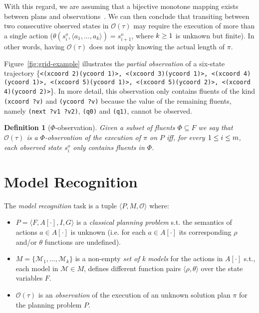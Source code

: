 \documentclass[letterpaper]{article} %
\newcommand{\tup}[1]{{\langle #1 \rangle}}
\newtheorem{definition}[theorem]{Definition}
\begin{document}
With this regard, we are assuming that a bijective monotone mapping exists between plans and observations~\cite{ramirez2009plan}. We can then  conclude that transiting between two consecutive observed states in $\mathcal{O}(\tau)$ may require the execution of more than a single action ($\theta(s_i^o,\tup{a_1,\ldots,a_k})=s_{i+1}^o$, where ${\small k\geq 1}$ is unknown but finite). In other words, having $\mathcal{O}(\tau)$ does not imply knowing the actual length of $\pi$.

Figure~\ref{fig:grid-example} illustrates the {\em partial observation} of a six-state trajectory \{{\tt\scriptsize<(xcoord 2)(ycoord 1)>, <(xcoord 3)(ycoord 1)>, <(xcoord 4)(ycoord 1)>, <(xcoord 5)(ycoord 1)>, <(xcoord 5)(ycoord 2)>, <(xcoord 4)(ycoord 2)>}\}. In more detail, this observation only contains fluents of the kind {\tt\small (xcoord ?v)} and {\tt\small (ycoord ?v)} because the value of the remaining fluents, namely {\tt\small (next ?v1 ?v2)}, {\tt\small (q0)} and {\tt\small (q1)}, cannot be observed.

\begin{definition}[$\Phi$-observation]
Given a subset of fluents $\Phi\subseteq F$ we say that $\mathcal{O}(\tau)$ is a $\Phi$-observation of the execution of $\pi$ on $P$ iff, for every ${\small 1\leq i\leq m}$, each observed state $s_i^o$ only contains fluents in $\Phi$.
\end{definition}



\section{Model Recognition}
\label{sec:recognition}
The {\em model recognition} task is a tuple $\tup{P,M,\mathcal{O}}$ where:
\begin{itemize}
\item $P=\tup{F,A[\cdot],I,G}$ is a {\em classical planning problem} s.t. the semantics of actions $a\in A[\cdot]$ is unknown (i.e. for each $a\in A[\cdot]$ its corresponding $\rho$ and/or $\theta$ functions are undefined).
\item $M=\{\mathcal{M}_1,\ldots,\mathcal{M}_k\}$ is a non-empty {\em set of k models} for the actions in $A[\cdot]$ s.t., each model in $\mathcal{M}\in M$, defines different function pairs $\tup{\rho,\theta}$ over the state variables $F$.
\item $\mathcal{O}(\tau)$ is an {\em observation} of the execution of an unknown solution plan $\pi$ for the planning problem $P$.
\end{itemize}
\end{document}
